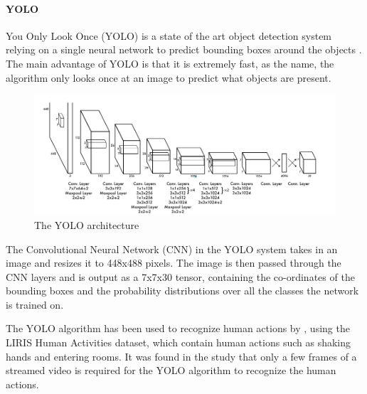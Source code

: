 \documentclass[12pt,a4paper]{report}
\begin{document}
\paragraph{YOLO}
You Only Look Once (YOLO) is a state of the art object detection system relying on a single neural network to predict bounding boxes around the objects \citep{Redmon2015}. The main advantage of YOLO is that it is extremely fast, as the name, the algorithm only looks once at an image to predict what objects are present.

\begin{figure}[h!]
	\begin{center}
		\includegraphics[scale=0.4]{Images/Literature/YOLO_Architecture.png}
		\caption{The YOLO architecture \citep{Redmon2015}}
	\end{center}
\end{figure}

The Convolutional Neural Network (CNN) in the YOLO system takes in an image and resizes it to 448x488 pixels. The image is then passed through the CNN layers and is output as a 7x7x30 tensor, containing the co-ordinates of the bounding boxes and the probability distributions over all the classes the network is trained on. 

The YOLO algorithm has been used to recognize human actions by \cite{Shinde2018}, using the LIRIS Human Activities dataset, which contain human actions such as shaking hands and entering rooms. It was found in the study that only a few frames of a streamed video is required for the YOLO algorithm to recognize the human actions.
\end{document}
